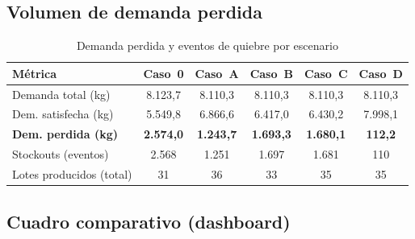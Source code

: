 \documentclass[12pt]{article}
\begin{document}
\subsection{Volumen de demanda perdida}

\begin{table}[H]
\centering
\caption{Demanda perdida y eventos de quiebre por escenario}
\label{tab:demanda-perdida}
\renewcommand{\arraystretch}{1.3}
\begin{tabularx}{\textwidth}{Xccccc}
\toprule
\rowcolor{tabhead}
\color{white}\textbf{Métrica} &
\color{white}\textbf{Caso~0} &
\color{white}\textbf{Caso~A} &
\color{white}\textbf{Caso~B} &
\color{white}\textbf{Caso~C} &
\color{white}\textbf{Caso~D} \\
\midrule
\rowcolor{tabrow} Demanda total (kg)       & 8.123,7 & 8.110,3 & 8.110,3 & 8.110,3 & 8.110,3 \\
Dem. satisfecha (kg)                       & 5.549,8 & 6.866,6 & 6.417,0 & 6.430,2 & 7.998,1 \\
\rowcolor{tabrow} \textbf{Dem. perdida (kg)} & \textbf{2.574,0} & \textbf{1.243,7} & \textbf{1.693,3} & \textbf{1.680,1} & \textbf{112,2} \\
Stockouts (eventos)                        & 2.568 & 1.251 & 1.697 & 1.681 & 110 \\
\rowcolor{tabrow} Lotes producidos (total) & 31 & 36 & 33 & 35 & 35 \\
\bottomrule
\end{tabularx}
\end{table}

\subsection{Cuadro comparativo (dashboard)}
\end{document}
